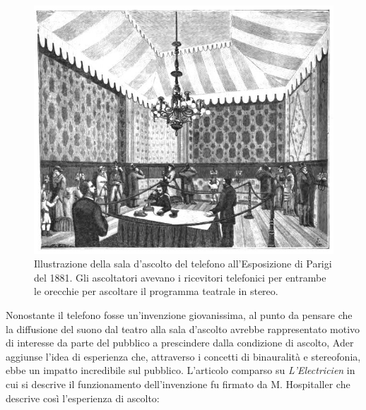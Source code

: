 \begin{figure}[t]
	\centering
	\includegraphics[width=0.99\columnwidth]{CAPITOLI/1000/IMG/1881opr4.jpg}
	\vspace{-10pt}
	\caption[]{Illustrazione della sala d'ascolto del telefono all'Esposizione di
	Parigi del 1881. Gli ascoltatori avevano i ricevitori telefonici per entrambe
	le orecchie per ascoltare il programma teatrale in stereo.}
	\label{fig:teatrophone2}
\end{figure}

Nonostante il telefono fosse un'invenzione giovanissima, al punto da pensare che
la diffusione del suono dal teatro alla sala d'ascolto avrebbe rappresentato
motivo di interesse da parte del pubblico a prescindere dalla condizione di
ascolto, Ader aggiunse l'idea di esperienza che, attraverso i concetti di
binauralità e stereofonia, ebbe un impatto incredibile sul pubblico. L'articolo
comparso su \emph{L'Electricien} in cui si descrive il funzionamento
dell'invenzione fu firmato da M. Hospitaller che descrive così l'esperienza di
ascolto:

